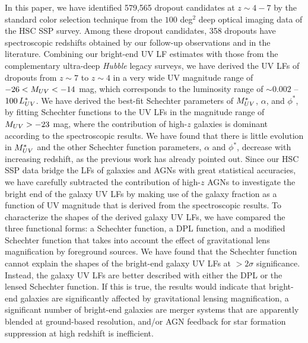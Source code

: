 \documentclass[]{pasj01}
\begin{document}
In this paper,
we have identified 
579,565 dropout candidates at $z \sim 4-7$ by the standard color selection technique 
from the $100$ deg$^2$ deep optical imaging data of the HSC SSP survey.  
Among these dropout candidates, 
358 dropouts have spectroscopic redshifts 
obtained by our follow-up observations and in the literature. 
Combining our bright-end UV LF estimates 
with those from the complementary ultra-deep \textit{Hubble} legacy surveys, 
we have derived the UV LFs of dropouts from $z \sim7$ to $z \sim 4$ 
in a very wide UV magnitude range of $-26 < M_{\rm UV} < -14$ mag, 
which corresponds to the luminosity range of $\sim 0.002$ -- $100 \, L_{\rm UV}^\ast$. 
% 
We have derived the best-fit Schechter parameters of $M_{\rm UV}^\ast$, $\alpha$, and $\phi^\ast$, 
by fitting Schechter functions to the UV LFs 
in the magnitude range of $M_{\rm UV} > -23$ mag, 
where the contribution of high-$z$ galaxies is dominant according to the spectroscopic results. 
We have found that 
there is little evolution in $M_{\rm UV}^\ast$ 
and the other Schechter function parameters, $\alpha$ and $\phi^\ast$, 
decrease with increasing redshift, as the previous work has already pointed out.  
% 
Since our HSC SSP data bridge the LFs of galaxies and AGNs with great statistical accuracies, 
we have carefully subtracted the contribution of high-$z$ AGNs 
to investigate the bright end of the galaxy UV LFs 
by making use of the galaxy fraction 
as a function of UV magnitude that is derived from the spectroscopic results.  
To characterize the shapes of the derived galaxy UV LFs, 
we have compared the three functional forms:  
a Schechter function, a DPL function, 
and a modified Schechter function that takes into account 
the effect of gravitational lens magnification by foreground sources. 
We have found that the Schechter function cannot explain 
the shapes of the bright-end galaxy UV LFs at $> 2 \sigma$ significance.  
Instead, the galaxy UV LFs are better described with 
either the DPL or the lensed Schechter function.  
If this is true, 
the results would indicate that 
bright-end galaxies are significantly affected by gravitational lensing magnification, 
a significant number of bright-end galaxies are 
merger systems that are apparently blended at ground-based resolution, 
and/or 
AGN feedback for star formation suppression at high redshift is inefficient.  
\end{document}
